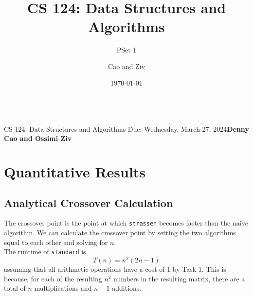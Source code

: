 \documentclass[11pt]{scrartcl}
\title{CS 124: Data Structures and Algorithms}
\subtitle{PSet 1}
\author{Cao and Ziv}
\date{\today}
\title{\psetName}
\makeatletter
\theoremstyle{dotlessP}
\theoremstyle{dotlessN}
\theoremstyle{dotN}
\newcommand{\courseNumber}{CS 124}
\newcommand{\courseName}{Data Structures and Algorithms}
\newcommand{\dueDate}{Due: Wednesday, March 27, 2024}
\newcommand{\name}{Denny Cao and Ossimi Ziv}
\renewcommand{\maketitle}{\bgroup\setlength{\parindent}{0pt}
    \begin{flushleft}
        {\Large\textbf{\@title}} \\ \vskip0.2cm
        \begingroup
            \fontsize{12pt}{12pt}\selectfont
            \courseNumber: \courseName 
        \endgroup \vskip0.3cm
        \dueDate \hfill\rlap{}\textbf{\name} \\ \vskip0.1cm
        \hrulefill
    \end{flushleft}\egroup 
}
\makeatother
\begin{document}
\maketitle
\thispagestyle{plain}
\section{Quantitative Results}
\subsection{Analytical Crossover Calculation}
The crossover point is the point at which \texttt{strassen} becomes faster than the naive algorithm. We can calculate the crossover point by setting the two algorithms equal to each other and solving for $n$.
\\

The runtime of \texttt{standard} is
\[
T(n)=n^2(2n-1)
\] 
assuming that all arithmetic operations
have a cost of 1 by Task 1. This is because, for each of the resulting $n^2$ numbers in the resulting matrix, there
are a total of $n$ multiplications and $n-1$ additions.
\\
\end{document}
